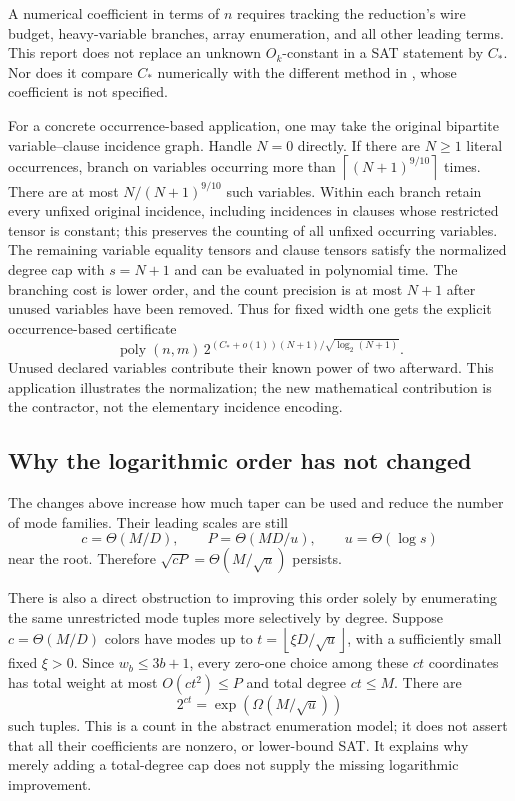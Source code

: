 \documentclass[11pt,letterpaper]{article}
\numberwithin{equation}{section}
\theoremstyle{definition}\newtheorem{definition}[theorem]{Definition}
\theoremstyle{remark}\newtheorem{remark}[theorem]{Remark}
\newcommand{\poly}{\operatorname{poly}}
\newcommand{\ceil}[1]{\left\lceil #1\right\rceil}
\newcommand{\floor}[1]{\left\lfloor #1\right\rfloor}
\newcommand{\Cstar}{C_*}
\begin{document}
A numerical coefficient in terms of $n$ requires tracking the reduction's
wire budget, heavy-variable branches, array enumeration, and all other
leading terms. This report does not replace an unknown $O_k$-constant
in a SAT statement by $\Cstar$. Nor does it compare $\Cstar$ numerically
with the different method in \cite{alternate}, whose coefficient is not
specified.

For a concrete occurrence-based application, one may take the original
bipartite variable--clause incidence graph. Handle $N=0$ directly. If there
are $N\ge1$ literal occurrences, branch on variables occurring more than $\ceil{(N+1)^{9/10}}$
times. There are at most $N/(N+1)^{9/10}$ such variables. Within each branch retain every unfixed original incidence, including
incidences in clauses whose restricted tensor is constant; this preserves
the counting of all unfixed occurring variables. The remaining
variable equality tensors and clause tensors satisfy the normalized degree
cap with $s=N+1$ and can be evaluated in polynomial time. The branching
cost is lower order, and the count precision is at most $N+1$ after unused
variables have been removed. Thus for fixed width one gets the explicit
occurrence-based certificate
\[
 \poly(n,m)\,
 2^{(\Cstar+o(1))(N+1)/\sqrt{\log_2(N+1)}}.
\]
Unused declared variables contribute their known power of two afterward.
This application illustrates the normalization; the new mathematical
contribution is the contractor, not the elementary incidence encoding.

\subsection{Why the logarithmic order has not changed}

The changes above increase how much taper can be used and reduce the
number of mode families. Their leading scales are still
\[
 c=\Theta(M/D),\qquad P=\Theta(MD/u),\qquad u=\Theta(\log s)
\]
near the root. Therefore $\sqrt{cP}=\Theta(M/\sqrt u)$ persists.

There is also a direct obstruction to improving this order solely by
enumerating the same unrestricted mode tuples more selectively by degree.
Suppose $c=\Theta(M/D)$ colors have modes up to
$t=\floor{\xi D/\sqrt u}$, with a sufficiently small fixed $\xi>0$.
Since $w_b\le3b+1$, every zero-one choice among these $ct$ coordinates
has total weight at most $O(ct^2)\le P$ and total degree $ct\le M$.
There are
\[
 2^{ct}=\exp(\Omega(M/\sqrt u))
\]
such tuples. This is a count in the abstract enumeration model; it does
not assert that all their coefficients are nonzero, or lower-bound SAT.
It explains why merely adding a total-degree cap does not supply the
missing logarithmic improvement.
\end{document}
